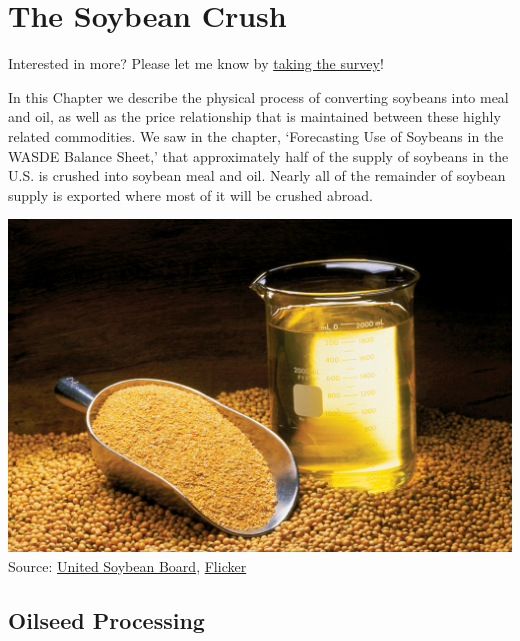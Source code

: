 \documentclass[
  letterpaper,
  DIV=11,
  numbers=noendperiod]{scrreprt}
\begin{document}

\hypertarget{the-soybean-crush}{%
\chapter{The Soybean Crush}\label{the-soybean-crush}}

{Interested in more? Please let me know by}
\href{https://forms.gle/Q3VByCQZHjfQSy9D7}{taking the survey}!

In this Chapter we describe the physical process of converting soybeans
into meal and oil, as well as the price relationship that is maintained
between these highly related commodities. We saw in the chapter,
`Forecasting Use of Soybeans in the WASDE Balance Sheet,' that
approximately half of the supply of soybeans in the U.S. is crushed into
soybean meal and oil. Nearly all of the remainder of soybean supply is
exported where most of it will be crushed abroad.

\includegraphics{images/soyoilmeal_checkoff.jpg} Source:
\href{http://unitedsoybean.org/}{United Soybean Board},
\href{https://www.flickr.com/photos/unitedsoybean/10059732523/in/photolist-gjWL1c-iSHsD6-gjRZN5-gjSiez-gjRDSm-3GTus-gjT5Pf-gjT5FQ-gjT5Zf-iRrGux-5mxrJp-iRuCDS-fEhEb4-iSHt56-gjSLAj-gjTptX-gjSLDL-gjSNeR-gjSLEC-gjT72q-6m2BCX-gjSUHT-gjTpzi-6m6Jay-qBtpPq-5wBq3U-gjWLbe-aMpXNc-qRDdLA-gjWY8m-rujuvk-iRqECD-rNDaeg-GL7Qd-6m2Yyc-6JGi4H-ar3khU-cNjfUf-6m2A3g-aE4dw4-c3VUt9-c3VVq5-4JzMWS-6KY45z-6m2Xsv-6m6Eny-6m2XZg-6m2WVa-6m2ZFF-6m7ad1}{Flicker}

\hypertarget{oilseed-processing}{%
\section{Oilseed Processing}\label{oilseed-processing}}
\end{document}
